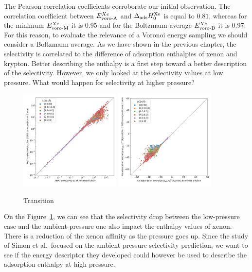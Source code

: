 \documentclass[main]{subfiles}
\begin{document}
The Pearson correlation coefficients corroborate our initial observation. The correlation coefficient between $E_{\text{voro-A}}^{Xe}$ and $\Delta_{\text{ads}} H_{0}^{\text{Xe}}$ is equal to $0.81$, whereas for the minimum $E_{\text{voro-M}}^{Xe}$ it is $0.95$ and for the Boltzmann average $E_{\text{voro-B}}^{Xe}$ it is $0.97$. For this reason, to evaluate the relevance of a Voronoi energy sampling we should consider a Boltzmann average. As we have shown in the previous chapter, the selectivity is correlated to the difference of adsorption enthalpies of xenon and krypton. Better describing the enthalpy is a first step toward a better description of the selectivity. However, we only looked at the selectivity values at low pressure. What would happen for selectivity at higher pressure?

\begin{figure}[ht]
  \centering
  \includegraphics[width=0.45\textwidth]{figures/3-fastsim/s_0_vs_s_2080_overview.jpg}
  \includegraphics[width=0.45\textwidth]{figures/3-fastsim/H_Xe_0_vs_H_Xe_2080_overview.jpg}
    \caption{Transition}\label{fgr:compa_pressure}
\end{figure}

On the Figure~\ref{fgr:compa_pressure}, we can see that the selectivity drop between the low-pressure case and the ambient-pressure one also impact the enthalpy values of xenon. There is a reduction of the xenon affinity as the pressure goes up. Since the study of Simon et al.\ focused on the ambient-pressure selectivity prediction, we want to see if the energy descriptor they developed could however be used to describe the adsorption enthalpy at high pressure. 
\end{document}
